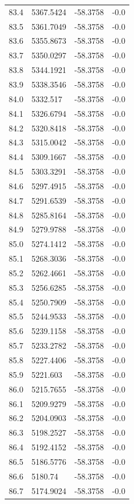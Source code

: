 \begin{table}[H]
\begin{tabular}{llll}
83.4 & 5367.5424 & -58.3758 & -0.0 \\
83.5 & 5361.7049 & -58.3758 & -0.0 \\
83.6 & 5355.8673 & -58.3758 & -0.0 \\
83.7 & 5350.0297 & -58.3758 & -0.0 \\
83.8 & 5344.1921 & -58.3758 & -0.0 \\
83.9 & 5338.3546 & -58.3758 & -0.0 \\
84.0 & 5332.517 & -58.3758 & -0.0 \\
84.1 & 5326.6794 & -58.3758 & -0.0 \\
84.2 & 5320.8418 & -58.3758 & -0.0 \\
84.3 & 5315.0042 & -58.3758 & -0.0 \\
84.4 & 5309.1667 & -58.3758 & -0.0 \\
84.5 & 5303.3291 & -58.3758 & -0.0 \\
84.6 & 5297.4915 & -58.3758 & -0.0 \\
84.7 & 5291.6539 & -58.3758 & -0.0 \\
84.8 & 5285.8164 & -58.3758 & -0.0 \\
84.9 & 5279.9788 & -58.3758 & -0.0 \\
85.0 & 5274.1412 & -58.3758 & -0.0 \\
85.1 & 5268.3036 & -58.3758 & -0.0 \\
85.2 & 5262.4661 & -58.3758 & -0.0 \\
85.3 & 5256.6285 & -58.3758 & -0.0 \\
85.4 & 5250.7909 & -58.3758 & -0.0 \\
85.5 & 5244.9533 & -58.3758 & -0.0 \\
85.6 & 5239.1158 & -58.3758 & -0.0 \\
85.7 & 5233.2782 & -58.3758 & -0.0 \\
85.8 & 5227.4406 & -58.3758 & -0.0 \\
85.9 & 5221.603 & -58.3758 & -0.0 \\
86.0 & 5215.7655 & -58.3758 & -0.0 \\
86.1 & 5209.9279 & -58.3758 & -0.0 \\
86.2 & 5204.0903 & -58.3758 & -0.0 \\
86.3 & 5198.2527 & -58.3758 & -0.0 \\
86.4 & 5192.4152 & -58.3758 & -0.0 \\
86.5 & 5186.5776 & -58.3758 & -0.0 \\
86.6 & 5180.74 & -58.3758 & -0.0 \\
86.7 & 5174.9024 & -58.3758 & -0.0 \\

\end{tabular}
\end{table}
